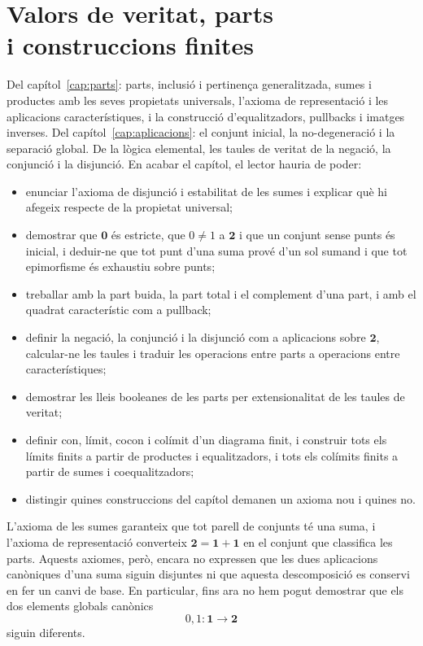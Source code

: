 \chapter[Valors de veritat i construccions finites]{Valors de veritat, parts\texorpdfstring{\\}{ }i construccions finites}\label{cap:valors}

\begin{objectius}
 Del capítol~\ref{cap:parts}: parts, inclusió i pertinença generalitzada, sumes i productes amb les seves propietats universals, l'axioma de representació i les aplicacions característiques, i la construcció d'equalitzadors, pullbacks i imatges inverses. Del capítol~\ref{cap:aplicacions}: el conjunt inicial, la no-degeneració i la separació global. De la lògica elemental, les taules de veritat de la negació, la conjunció i la disjunció.
 En acabar el capítol, el lector hauria de poder:
\begin{itemize}
  \item enunciar l'axioma de disjunció i estabilitat de les sumes i explicar què hi afegeix respecte de la propietat universal;
  \item demostrar que \(\mathbf0\) és estricte, que \(0\ne1\) a \(\mathbf2\) i que un conjunt sense punts és inicial, i deduir-ne que tot punt d'una suma prové d'un sol sumand i que tot epimorfisme és exhaustiu sobre punts;
  \item treballar amb la part buida, la part total i el complement d'una part, i amb el quadrat característic com a pullback;
  \item definir la negació, la conjunció i la disjunció com a aplicacions sobre \(\mathbf2\), calcular-ne les taules i traduir les operacions entre parts a operacions entre característiques;
  \item demostrar les lleis booleanes de les parts per extensionalitat de les taules de veritat;
  \item definir con, límit, cocon i colímit d'un diagrama finit, i construir tots els límits finits a partir de productes i equalitzadors, i tots els colímits finits a partir de sumes i coequalitzadors;
  \item distingir quines construccions del capítol demanen un axioma nou i quines no.
\end{itemize}
\end{objectius}

L'axioma de les sumes garanteix que tot parell de conjunts té una suma, i
l'axioma de representació converteix
\(\mathbf2=\mathbf1+\mathbf1\) en el conjunt que classifica les parts.
Aquests axiomes, però, encara no expressen que les dues aplicacions
canòniques d'una suma siguin disjuntes ni que aquesta descomposició es
conservi en fer un canvi de base. En particular, fins ara no hem pogut
demostrar que els dos elements globals canònics
\[
0,1:\mathbf1\to\mathbf2
\]
siguin diferents.


